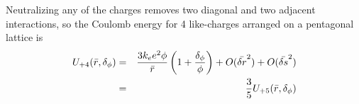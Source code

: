 \documentclass[journal=jacsat,manuscript=article]{achemso}
\begin{document}
Neutralizing any of the charges removes two diagonal and two adjacent interactions, so the Coulomb energy for 4 like-charges arranged on a pentagonal lattice is
\begin{eqnarray}
U_{+4}(\bar{r},\delta_{\phi}) &=& \frac{ 3 k_{e} e^{2}\phi}{\bar{r}}\left( 1+ \frac{\delta_{\phi}}{\phi} \right) + O(\bar{\delta r}^{2})+ O(\bar{\delta s}^{2})\\
& =& \frac{3}{5} U_{+5}(\bar{r},\delta_{\phi})
 \label{eq:mutant_pentamer}
\end{eqnarray} 
\end{document}
